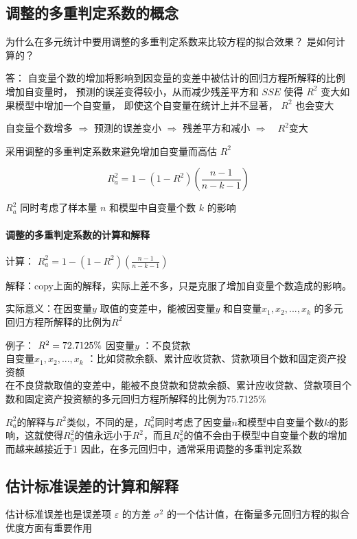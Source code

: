 \documentclass[UTF8,10pt]{book}
\begin{document}
{\subsection{调整的多重判定系数的概念}

为什么在多元统计中要用调整的多重判定系数来比较方程的拟合效果？ 是如何计算的？ 

{\kaishu 答： 自变量个数的增加将影响到因变量的变差中被估计的回归方程所解释的比例增加自变量时，
预测的误差变得较小，从而减少残差平方和 $SSE$ 
使得 $R^2$ 变大如果模型中增加一个自变量，
即使这个自变量在统计上并不显著， $R^2$ 也会变大 }

自变量个数增多 $\Rightarrow$ 预测的误差变小 $\Rightarrow$ 残差平方和减小 $\Rightarrow \quad R^2$变大 

采用调整的多重判定系数来避免增加自变量而高估 $R^2$ 

$$ R_a^2 =1-(1-R^2)(\frac{n-1}{n-k-1}) $$ 

$R_a^2$ 同时考虑了样本量 $ n$ 和模型中自变量个数 $k$ 的影响

\paragraph{调整的多重判定系数的计算和解释}	

计算： 
$ R_a^2 =1-(1-R^2)(\frac{n-1}{n-k-1}) $

解释：copy上面的解释，实际上差不多，只是克服了增加自变量个数造成的影响。 

实际意义：在因变量$y$ 取值的变差中，能被因变量$y$ 和自变量$x_1,x_2,...,x_k$ 的多元回归方程所解释的比例为$R^2$ 

例子： $R^2=72.7125\% \\
$ 因变量$y$ ：不良贷款 \\
自变量$x_1,x_2,...,x_k$ ：比如贷款余额、累计应收贷款、贷款项目个数和固定资产投资额 \\
在不良贷款取值的变差中，能被不良贷款和贷款余额、累计应收贷款、贷款项目个数和固定资产投资额的多元回归方程所解释的比例为75.7125\% 

$R_a^2$的解释与$R^2$类似，不同的是，$R_a^2$同时考虑了因变量$n$和模型中自变量个数$k$的影响，这就使得$R_a^2$的值永远小于$R^2$，而且$R_a^2$的值不会由于模型中自变量个数的增加而越来越接近于1 因此，在多元回归中，通常采用调整的多重判定系数

\subsection{估计标准误差的计算和解释}	

估计标准误差也是误差项 $\varepsilon$ 的方差 $ \sigma^2 $ 的一个估计值，在衡量多元回归方程的拟合优度方面有重要作用 

}
\end{document}

